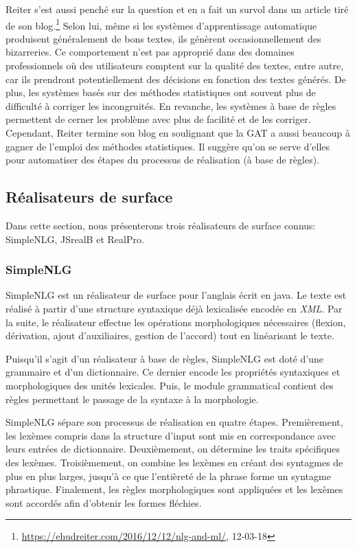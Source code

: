 Reiter s'est aussi penché sur la question et en a fait un survol dans un article tiré de son blog.\footnote{\url{https://ehudreiter.com/2016/12/12/nlg-and-ml/}, 12-03-18} Selon lui, même si les systèmes d'apprentissage automatique produisent généralement de bons textes, ils génèrent occasionnellement des bizarreries. Ce comportement n'est pas approprié dans des domaines professionnels où des utilisateurs comptent sur la qualité des textes, entre autre, car ils prendront potentiellement des décisions en fonction des textes générés. De plus, les systèmes basés sur des méthodes statistiques ont souvent plus de difficulté à corriger les incongruités. En revanche, les systèmes à base de règles permettent de cerner les problème avec plus de facilité et de les corriger. Cependant, Reiter termine son blog en soulignant que la \ac{GAT} a aussi beaucoup à gagner de l'emploi des méthodes statistiques. Il suggère qu'on se serve d'elles pour automatiser des étapes du processus de réalisation (à base de règles).


\subsection{Réalisateurs de surface}

Dans cette section, nous présenterons trois réalisateurs de surface connus: SimpleNLG, JSrealB et RealPro.

\subsubsection{SimpleNLG}
SimpleNLG \citep{GattSimpleNLGRealisationEngine2009} est un réalisateur de surface pour l'anglais écrit en java. Le texte est réalisé à partir d'une structure syntaxique déjà lexicalisée encodée en \emph{XML}. Par la suite, le réalisateur effectue les opérations morphologiques nécessaires (flexion, dérivation, ajout d'auxiliaires, gestion de l'accord) tout en linéarisant le texte.

Puisqu'il s'agit d'un réalisateur à base de règles, SimpleNLG est doté d'une grammaire et d'un dictionnaire. Ce dernier encode les propriétés syntaxiques et morphologiques des unités lexicales. Puis, le module grammatical contient des règles permettant le passage de la syntaxe à la morphologie.

SimpleNLG sépare son processus de réalisation en quatre étapes. Premièrement, les lexèmes compris dans la structure d'input sont mis en correspondance avec leurs entrées de dictionnaire. Deuxièmement, on détermine les traits spécifiques des lexèmes. Troisièmement, on combine les lexèmes en créant des syntagmes de plus en plus larges, jusqu'à ce que l'entièreté de la phrase forme un syntagme phrastique. Finalement, les règles morphologiques sont appliquées et les lexèmes sont accordés afin d'obtenir les formes fléchies.

